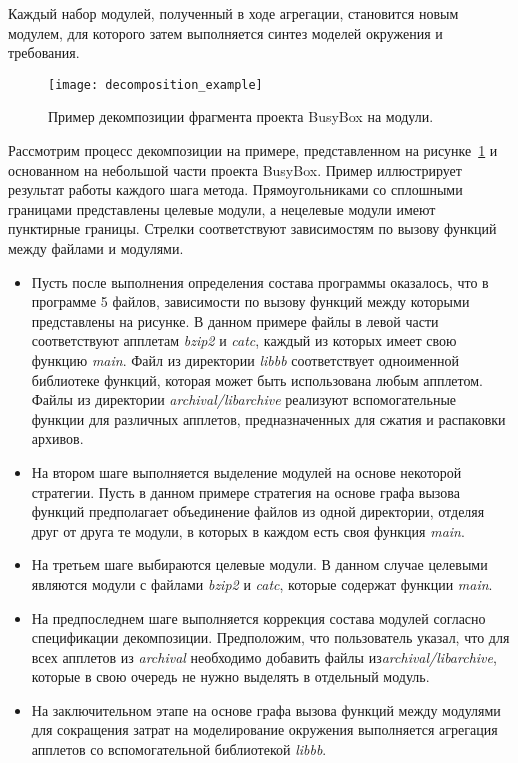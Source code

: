 Каждый набор модулей, полученный в ходе агрегации, становится новым модулем, для которого затем выполняется синтез моделей окружения и требования.

\begin{figure}
\centering
\texttt{[image: decomposition\_example]}
\caption{Пример декомпозиции фрагмента проекта BusyBox на модули.}
\label{figure:decomposition_example}
\end{figure}

Рассмотрим процесс декомпозиции на примере, представленном на рисунке~\ref{figure:decomposition_example} и основанном на небольшой части проекта BusyBox.
Пример иллюстрирует результат работы каждого шага метода.
Прямоугольниками со сплошными границами представлены целевые модули, а нецелевые модули имеют пунктирные границы.
Стрелки соответствуют зависимостям по вызову функций между файлами и модулями.
\begin{itemize}
    \item Пусть после выполнения определения состава программы оказалось, что в программе 5 файлов, зависимости по вызову функций между которыми представлены на рисунке. 
    В данном примере файлы в левой части соответствуют апплетам \textit{bzip2} и \textit{catc}, каждый из которых имеет свою функцию \textit{main}.
    Файл из директории \textit{libbb} соответствует одноименной библиотеке функций, которая может быть использована любым апплетом.
    Файлы из директории \textit{archival/libarchive} реализуют вспомогательные функции для различных апплетов, предназначенных для сжатия и распаковки архивов.
    \item На втором шаге выполняется выделение модулей на основе некоторой стратегии.
    Пусть в данном примере стратегия на основе графа вызова функций предполагает объединение файлов из одной директории, отделяя друг от друга те модули, в которых в каждом есть своя функция \textit{main}.
    \item На третьем шаге выбираются целевые модули.
    В данном случае целевыми являются модули с файлами \textit{bzip2} и \textit{catc}, которые содержат функции \textit{main}.
    \item На предпоследнем шаге выполняется коррекция состава модулей согласно спецификации декомпозиции.
    Предположим, что пользователь указал, что для всех апплетов из \textit{archival} необходимо добавить файлы из\break \textit{archival/libarchive}, которые в свою очередь не нужно выделять в отдельный модуль.
    \item На заключительном этапе на основе графа вызова функций между модулями для сокращения затрат на моделирование окружения выполняется агрегация апплетов со вспомогательной библиотекой \textit{libbb}.
\end{itemize}

